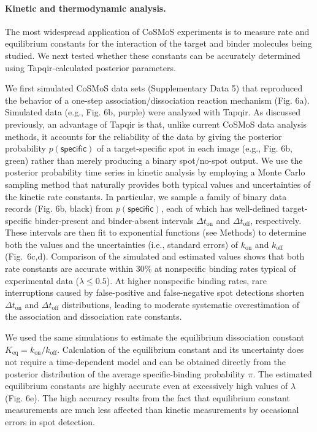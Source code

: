 \paragraph{Kinetic and thermodynamic analysis.}
The most widespread application of CoSMoS experiments is to measure rate and equilibrium constants for the interaction of the target and binder molecules being studied.  We next tested whether these constants can be accurately determined using Tapqir-calculated posterior parameters. 

We first simulated CoSMoS data sets (Supplementary Data 5) that reproduced the behavior of a one-step association/dissociation reaction mechanism (Fig. 6a). Simulated data (e.g., Fig. 6b, purple) were analyzed with Tapqir.   As discussed previously, an advantage of Tapqir is that, unlike current CoSMoS data analysis methods, it accounts for the reliability of the data by giving the posterior probability $p(\mathsf{specific})$ of a target-specific spot in each image (e.g., Fig. 6b, green) rather than merely producing a binary spot/no-spot output.  We use the posterior probability time series in kinetic analysis by employing a Monte Carlo sampling method that naturally provides both typical values and uncertainties of the kinetic rate constants.  In particular, we sample a family of binary data records (Fig. 6b, black) from $p(\mathsf{specific})$, each of which has well-defined target-specific binder-present and binder-absent intervals $\Delta t_\mathrm{on}$ and $\Delta t_\mathrm{off}$,  respectively. These intervals are then fit to exponential functions (see Methods) to determine both the values and the uncertainties (i.e., standard errors) of $k_\mathrm{on}$ and $k_\mathrm{off}$ (Fig.~6c,d). Comparison of the simulated and estimated values shows that both rate constants are accurate within 30\% at nonspecific binding rates typical of experimental data ($\lambda \leq 0.5$). At higher nonspecific binding rates, rare interruptions caused by false-positive and false-negative spot detections shorten $\Delta t_\mathrm{on}$ and $\Delta t_\mathrm{off}$ distributions, leading to moderate systematic overestimation of the association and dissociation rate constants.

We used the same simulations to estimate the equilibrium dissociation constant $K_\mathrm{eq} = k_\mathrm{on}/k_\mathrm{off}$.  Calculation of the equilibrium constant and its uncertainty does not require a time-dependent model and can be obtained directly from the posterior distribution of the average specific-binding probability $\pi$. The estimated equilibrium constants are highly accurate even at excessively  high values of $\lambda$ (Fig. 6e).  The high accuracy results from the fact that equilibrium constant measurements are much less affected than kinetic measurements by occasional errors in spot detection. 

